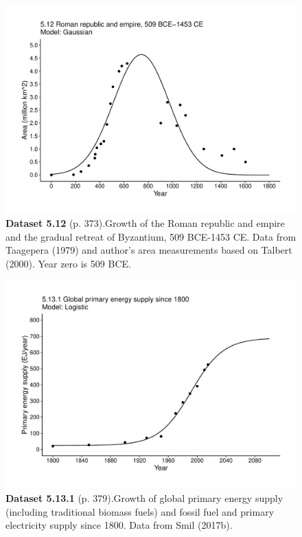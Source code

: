 \documentclass[aps,rmp,preprint,superscriptaddress,10pt,onecolumn]{article}
\begin{document}
\clearpage
\begin{figure}[h]
\includegraphics[width=\textwidth]{output/figs-ggplot/5.12.pdf}
\caption*{\textbf{Dataset 5.12} (p. 373).Growth of the Roman republic and empire and the gradual retreat of Byzantium, 509 BCE-1453 CE. Data from Taagepera (1979) and author's area measurements based on Talbert (2000). Year zero is 509 BCE. }
\end{figure}
	
\clearpage
\begin{figure}[h]
\includegraphics[width=\textwidth]{output/figs-ggplot/5.13.1.pdf}
\caption*{\textbf{Dataset 5.13.1} (p. 379).Growth of global primary energy supply (including traditional biomass fuels) and fossil fuel and primary electricity supply since 1800. Data from Smil (2017b). }
\end{figure}
	
\end{document}
